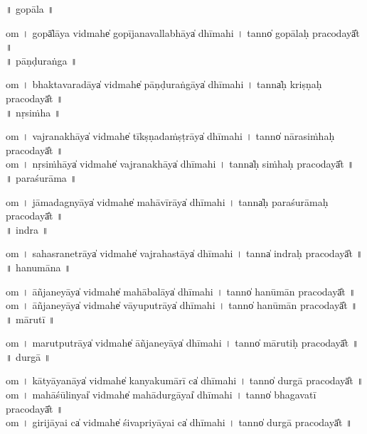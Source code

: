 \documentclass[parskip, DIV=14]{scrartcl}
\begin{document}
\vspace{0.201cm} ॥   gopāla  ॥ \par
  om  । gopā̍lāya vi॒dmahe̍ gopījanavalla॒bhāya̍ dhīmahi  ।  tanno̍ gopālaḥ praco॒dayā̎t ॥ \\

\vspace{0.201cm} ॥   pāṇḍuraṅga  ॥ \par
  om  । bha॒kta॒va॒ra॒dāya̍ vi॒dmahe̍ pāṇḍura॒ṅgāya̍ dhīmahi  ।  tanna̍ḥ kriṣṇaḥ praco॒dayā̎t ॥ \\

\vspace{0.201cm} ॥   nṛsiṁha  ॥ \par  
  om  । va॒jra॒na॒khāya̍ vi॒dmahe̍ tīkṣṇada॒ṁṣṭrāya̍ dhīmahi  ।  tanno̍ nārasiṁhaḥ praco॒dayā̎t ॥ \\
  om  । nṛ॒si॒ṁhāya̍ vi॒dmahe̍ vajrana॒khāya̍ dhīmahi  ।  tanna̍ḥ siṁhaḥ praco॒dayā̎t ॥ \\

\vspace{0.201cm} ॥   paraśurāma  ॥ \par
  om  । jā॒ma॒da॒gnyāya̍ vi॒dmahe̍ mahāvī॒rāya̍ dhīmahi  ।  tanna̍ḥ paraśurāmaḥ praco॒dayā̎t ॥ \\

\vspace{0.201cm} ॥   indra  ॥ \par
  om  । sa॒ha॒sra॒ne॒trāya̍ vi॒dmahe̍ vajraha॒stāya̍ dhīmahi  ।  tanna̍ indraḥ praco॒dayā̎t ॥ \\

\vspace{0.201cm} ॥   hanumāna  ॥ \par
  om  । ā॒ñja॒ne॒yāya̍ vi॒dmahe̍ mahāba॒lāya̍ dhīmahi  ।  tanno̍ hanūmān praco॒dayā̎t ॥ \\
  om  । ā॒ñja॒ne॒yāya̍ vi॒dmahe̍ vāyupu॒trāya̍ dhīmahi  ।  tanno̍ hanūmān praco॒dayā̎t ॥ \\

\vspace{0.201cm} ॥   mārutī  ॥ \par
  om  । ma॒ru॒tpu॒trāya̍ vi॒dmahe̍ āñjane॒yāya̍ dhīmahi  ।  tanno̍ mārutiḥ praco॒dayā̎t ॥ \\

\vspace{0.201cm} ॥   durgā  ॥ \par
  om  । kā॒tyā॒ya॒nāya̍ vi॒dmahe̍ kanyakumā॒rī ca̍ dhīmahi  ।  tanno̍ durgā praco॒dayā̎t ॥ \\
  om  । ma॒hā॒śū॒linyai̍ vi॒dmahe̍ mahādu॒rgāyai̍ dhīmahi  ।  tanno̍ bhagavatī praco॒dayā̎t ॥ \\
  om  । gi॒ri॒jā॒yai ca̍ vi॒dmahe̍ śivapriyā॒yai ca̍ dhīmahi  ।  tanno̍ durgā praco॒dayā̎t ॥ \\
\end{document}
